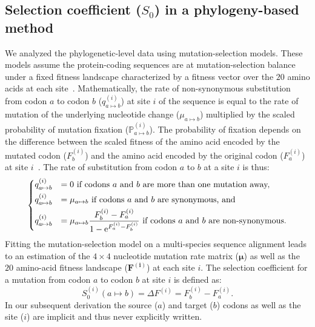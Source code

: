 \documentclass[12pt]{article}
\newcommand{\UniDimArray}[1]{\bm{#1}}
\newcommand{\e}{\text{e}}
\newcommand{\proba}{\mathbb{P}}
\newcommand{\Sphy}{S_{0}}
\begin{document}
    \subsection{Selection coefficient ($\Sphy$) in a phylogeny-based method}
    \label{subsec:s-phylogeny-method}
    We analyzed the phylogenetic-level data using mutation-selection models.
    These models assume the protein-coding sequences are at mutation-selection balance under a fixed fitness landscape characterized by a fitness vector over the $20$ amino acids at each site~\cite{yang_mutationselection_2008, halpern_evolutionary_1998, rodrigue_mechanistic_2010}.
    Mathematically, the rate of non-synonymous substitution from codon $a$ to codon $b$ ($q_{a \mapsto b}^{(i)}$) at site $i$ of the sequence is equal to the rate of mutation of the underlying nucleotide change ($\mu_{a \mapsto b}$) multiplied by the scaled probability of mutation fixation ($\proba_{a \mapsto b}^{(i)}$).
    The probability of fixation depends on the difference between the scaled fitness of the amino acid encoded by the mutated codon ($F_b^{(i)}$) and the amino acid encoded by the original codon ($F_a^{(i)}$) at site $i$~\cite{wright_evolution_1931, fisher_genetical_1930}.
    The rate of substitution from codon $a$ to $b$ at a site $i$ is thus:
    \begin{equation}
        \begin{dcases}
            q_{a \mapsto b}^{(i)} & = 0 \text{ if codons $a$ and $b$ are more than one mutation away,} \\
            q_{a \mapsto b}^{(i)} & = \mu_{a \mapsto b} \text{ if codons $a$ and $b$ are synonymous, and}\\
            q_{a \mapsto b}^{(i)} & = \mu_{a \mapsto b} \dfrac{F_b^{(i)} - F_a^{(i)}}{1 - \e^{F_a^{(i)} - F_b^{(i)}}} \text{ if codons $a$ and $b$ are non-synonymous}.
        \end{dcases}
    \end{equation}
    Fitting the mutation-selection model on a multi-species sequence alignment leads to an estimation of the $4 \times 4$ nucleotide mutation rate matrix ($\UniDimArray{\mu}$) as well as the $20$ amino-acid fitness landscape ($\UniDimArray{F^{(i)}}$) at each site $i$.
    The selection coefficient for a mutation from codon $a$ to codon $b$ at site $i$ is defined as:
    \begin{equation}
        \Sphy^{(i)} (a \mapsto b) = \Delta F^{(i)} = F^{(i)}_{b} - F^{(i)}_{a}.
    \end{equation}
    In our subsequent derivation the source ($a$) and target ($b$) codons as well as the site ($i$) are implicit and thus never explicitly written.
\end{document}
